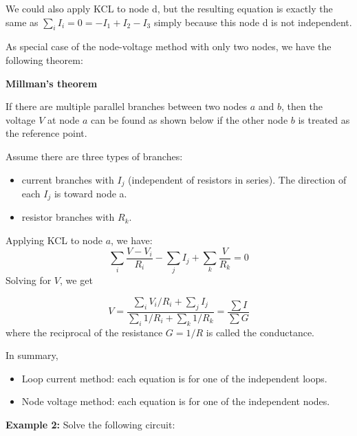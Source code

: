 \begin{itemize}
  We could also apply KCL to node d, but the resulting equation is exactly
  the same as $\sum_i I_i=0=-I_1+I_2-I_3$ simply because this node d is not 
  independent.

  As special case of the node-voltage method with only two nodes, we have the
  following theorem:

  {\bf Millman's theorem} 

  If there are multiple parallel branches between two
  nodes $a$ and $b$, then the voltage $V$ at node $a$ can be found as shown
  below if the other node $b$ is treated as the reference point.

  Assume there are three types of branches:
  \begin{itemize}
  \item current branches with $I_j$ (independent of resistors in series).
    The direction of each $I_j$ is toward node a.
  \item resistor branches with $R_k$.
  \end{itemize}

  Applying KCL to node $a$, we have:
  \[ 
  \sum_i \frac{V-V_i}{R_i}-\sum_j I_j+\sum_k \frac{V}{R_k}=0 
  \]
  Solving for $V$, we get

  \[ 
  V=\frac{\sum_i V_i/R_i+\sum_j I_j}{\sum_i 1/R_i+\sum_k 1/R_k}=\frac{\sum I}{\sum G} 
  \]
  where the reciprocal of the resistance $G=1/R$ is called the conductance.


\end{itemize}

In summary, 
\begin{itemize}
  \item Loop  current method: each equation is for one of the independent loops.
  \item Node  voltage method: each equation is for one of the independent nodes.
\end{itemize}


{\bf Example 2:} Solve the following circuit:


